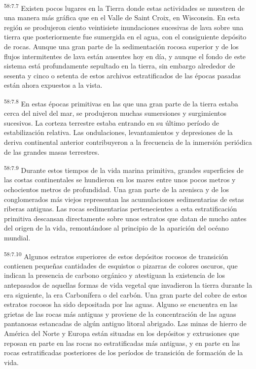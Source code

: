 \par
\textsuperscript{58:7.7} Existen pocos lugares en la Tierra donde estas actividades se muestren de una manera más gráfica que en el Valle de Saint Croix, en Wisconsin. En esta región se produjeron ciento veintisiete inundaciones sucesivas de lava sobre una tierra que posteriormente fue sumergida en el agua, con el consiguiente depósito de rocas. Aunque una gran parte de la sedimentación rocosa superior y de los flujos intermitentes de lava están ausentes hoy en día, y aunque el fondo de este sistema está profundamente sepultado en la tierra, sin embargo alrededor de sesenta y cinco o setenta de estos archivos estratificados de las épocas pasadas están ahora expuestos a la vista.

\par
\textsuperscript{58:7.8} En estas épocas primitivas en las que una gran parte de la tierra estaba cerca del nivel del mar, se produjeron muchas sumersiones y surgimientos sucesivos. La corteza terrestre estaba entrando en su último período de estabilización relativa. Las ondulaciones, levantamientos y depresiones de la deriva continental anterior contribuyeron a la frecuencia de la inmersión periódica de las grandes masas terrestres.

\par
\textsuperscript{58:7.9} Durante estos tiempos de la vida marina primitiva, grandes superficies de las costas continentales se hundieron en los mares entre unos pocos metros y ochocientos metros de profundidad. Una gran parte de la arenisca y de los conglomerados más viejos representan las acumulaciones sedimentarias de estas riberas antiguas. Las rocas sedimentarias pertenecientes a esta estratificación primitiva descansan directamente sobre unos estratos que datan de mucho antes del origen de la vida, remontándose al principio de la aparición del océano mundial.

\par
\textsuperscript{58:7.10} Algunos estratos superiores de estos depósitos rocosos de transición contienen pequeñas cantidades de esquistos o pizarras de colores oscuros, que indican la presencia de carbono orgánico y atestiguan la existencia de los antepasados de aquellas formas de vida vegetal que invadieron la tierra durante la era siguiente, la era Carbonífera o del carbón. Una gran parte del cobre de estos estratos rocosos ha sido depositada por las aguas. Alguno se encuentra en las grietas de las rocas más antiguas y proviene de la concentración de las aguas pantanosas estancadas de algún antiguo litoral abrigado. Las minas de hierro de América del Norte y Europa están situadas en los depósitos y extrusiones que reposan en parte en las rocas no estratificadas más antiguas, y en parte en las rocas estratificadas posteriores de los períodos de transición de formación de la vida.


